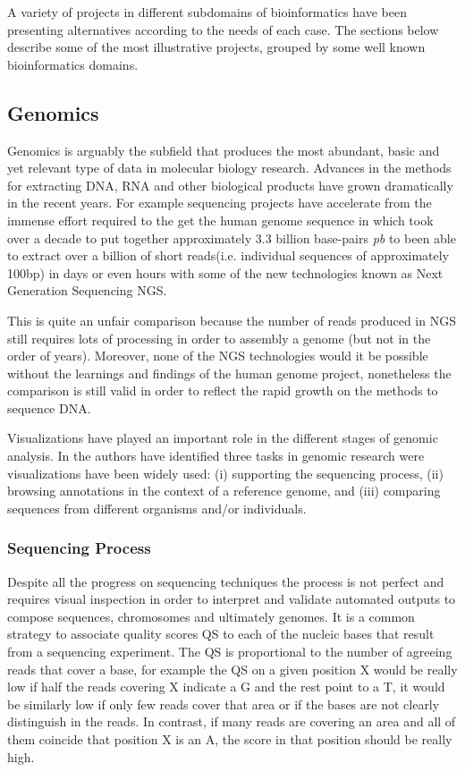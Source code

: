 A variety of projects in different subdomains of bioinformatics have been presenting alternatives according to the needs of each case. The sections below describe some of the most illustrative projects, grouped by some well known bioinformatics domains.

\subsection{Genomics}
Genomics is arguably the subfield that produces the most abundant, basic and yet relevant type of data in molecular biology research. Advances in the methods for extracting DNA, RNA and other biological products have grown dramatically in the recent years. For example sequencing projects have accelerate from the immense effort required to the get the human genome sequence in which took over a decade to put together approximately 3.3 billion base-pairs \emph{pb} to been able to extract over a billion of short reads(i.e. individual sequences of approximately 100bp) in days or even hours with some of the new technologies known as Next Generation Sequencing NGS.

This is quite an unfair comparison because the number of reads produced in NGS still requires lots of processing in order to assembly a genome (but not in the order of years). Moreover, none of the NGS technologies would it be possible without the learnings and findings of the human genome project, nonetheless the comparison is still valid in order to reflect the rapid growth on the methods to sequence DNA.

Visualizations have played an important role in the different stages of genomic analysis. In \cite{NIE2010} the authors have identified three tasks in genomic research were visualizations have been widely used: (i) supporting the sequencing process, (ii) browsing annotations in the context of a reference genome, and (iii) comparing sequences from different organisms and/or individuals.

\subsubsection{Sequencing Process}
Despite all the progress on sequencing techniques the process is not perfect and requires visual inspection in order to interpret and validate automated outputs to compose sequences, chromosomes and ultimately genomes. It is a common strategy to associate quality scores QS to each of the nucleic bases that result from a sequencing experiment. The QS is proportional to the number of agreeing reads that cover a base, for example the QS on a given position X would be really low if half the reads covering X indicate a G and the rest point to a T, it would be similarly low if only few reads cover that area or if the bases are not clearly distinguish in the reads. In contrast, if many reads are covering an area and all of them coincide that position X is an A, the score in that position should be really high.

